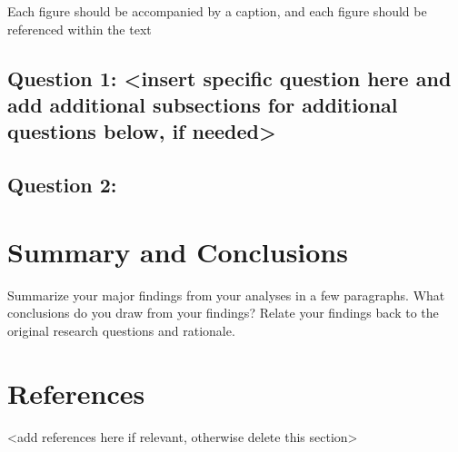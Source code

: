 \documentclass[12pt,]{article}
\begin{document}
Each figure should be accompanied by a caption, and each figure should
be referenced within the text

\hypertarget{question-1-insert-specific-question-here-and-add-additional-subsections-for-additional-questions-below-if-needed}{%
\subsection{Question 1: \textless{}insert specific question here and add
additional subsections for additional questions below, if
needed\textgreater{}}\label{question-1-insert-specific-question-here-and-add-additional-subsections-for-additional-questions-below-if-needed}}

\hypertarget{question-2}{%
\subsection{Question 2:}\label{question-2}}

\newpage

\hypertarget{summary-and-conclusions}{%
\section{Summary and Conclusions}\label{summary-and-conclusions}}

Summarize your major findings from your analyses in a few paragraphs.
What conclusions do you draw from your findings? Relate your findings
back to the original research questions and rationale.

\newpage

\hypertarget{references}{%
\section{References}\label{references}}

\textless{}add references here if relevant, otherwise delete this
section\textgreater{}
\end{document}
